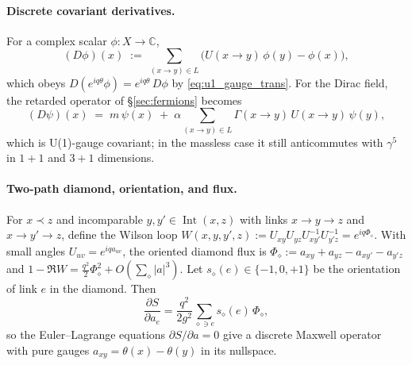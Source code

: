 \documentclass[12pt,a4paper]{article}
\begin{document}
\paragraph{Discrete covariant derivatives.}
For a complex scalar $\phi:X\to\mathbb C$,
\begin{equation}\label{eq:cov_diff_scalar}
  (D\phi)(x)\;:=\;\sum_{(x\to y)\in L}\big(U(x\!\to\!y)\,\phi(y)-\phi(x)\big),
\end{equation}
which obeys $D(e^{iq\theta}\phi)=e^{iq\theta}\,D\phi$ by \eqref{eq:u1_gauge_trans}.
For the Dirac field, the retarded operator of \S\ref{sec:fermions} becomes
\begin{equation}\label{eq:dirac_u1}
  (D\psi)(x)\;=\;m\,\psi(x)\;+\;\alpha\!\!\sum_{(x\to y)\in L}\!\!\Gamma(x\!\to\!y)\,U(x\!\to\!y)\,\psi(y),
\end{equation}
which is U(1)-gauge covariant; in the massless case it still anticommutes with $\gamma^5$ in $1{+}1$ and $3{+}1$ dimensions.


\paragraph{Two‑path diamond, orientation, and flux.}
For \(x\prec z\) and incomparable \(y,y'\in\operatorname{Int}(x,z)\) with links \(x\to y\to z\) and \(x\to y'\to z\),
define the Wilson loop \(W(x,y,y',z):=U_{xy}U_{yz}U_{xy'}^{-1}U_{y'z}^{-1}=e^{iq\Phi_\diamond}\).
With small angles \(U_{uv}=e^{iq a_{uv}}\), the oriented diamond flux is
\(\Phi_\diamond:=a_{xy}+a_{yz}-a_{xy'}-a_{y'z}\) and \(1-\Re W=\tfrac{q^2}{2}\Phi_\diamond^2+O(\sum_{\diamond}|a|^3)\).
Let \(s_\diamond(e)\in\{-1,0,+1\}\) be the orientation of link \(e\) in the diamond. Then
\[
\frac{\partial S}{\partial a_e}=\frac{q^2}{2g^2}\sum_{\diamond\ni e} s_\diamond(e)\,\Phi_\diamond,
\]
so the Euler–Lagrange equations \(\partial S/\partial a=0\) give a discrete Maxwell operator with pure gauges
\(a_{xy}=\theta(x)-\theta(y)\) in its nullspace.
\end{document}
